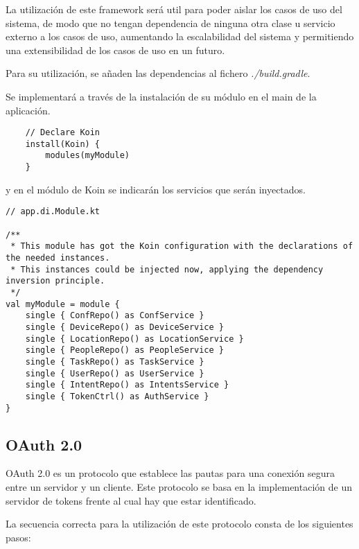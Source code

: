 La utilización de este framework será util para poder aislar los casos de uso del sistema, de modo que no tengan dependencia de ninguna otra clase u servicio externo a los casos de uso, aumentando la escalabilidad del sistema y permitiendo una extensibilidad de los casos de uso en un futuro.

Para su utilización, se añaden las dependencias al fichero \textit{./build.gradle}.

Se implementará a través de la instalación de su módulo en el main de la aplicación.
\begin{lstlisting}
    // Declare Koin
    install(Koin) {
        modules(myModule)
    }
\end{lstlisting}

y en el módulo de Koin se indicarán los servicios que serán inyectados.
\begin{lstlisting}
// app.di.Module.kt

/**
 * This module has got the Koin configuration with the declarations of the needed instances.
 * This instances could be injected now, applying the dependency inversion principle.
 */
val myModule = module {
    single { ConfRepo() as ConfService }
    single { DeviceRepo() as DeviceService }
    single { LocationRepo() as LocationService }
    single { PeopleRepo() as PeopleService }
    single { TaskRepo() as TaskService }
    single { UserRepo() as UserService }
    single { IntentRepo() as IntentsService }
    single { TokenCtrl() as AuthService }
}
\end{lstlisting}


    \subsection{OAuth 2.0}
    \label{oauth20}
    
OAuth 2.0 es un protocolo que establece las pautas para una conexión segura entre un servidor y un cliente.
Este protocolo se basa en la implementación de un servidor de tokens frente al cual hay que estar identificado.~\cite{oauth2}

La secuencia correcta para la utilización de este protocolo consta de los siguientes pasos:

